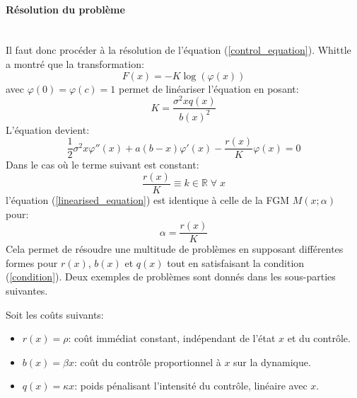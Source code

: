 \paragraph{Résolution du problème}\phantom{}\\
Il faut donc procéder à la résolution de l'équation (\ref{control_equation}). Whittle~\cite{whittle1982} a montré que la transformation: 
\[F(x)=-K\log(\varphi(x))\]
avec $\varphi(0)=\varphi(c)=1$ permet de linéariser l'équation en posant:
\[
K=\frac{\sigma^2xq(x)}{{b(x)}^2}
\]
L'équation devient:
\begin{equation}\label{linearised_equation}
    \frac{1}{2}\sigma^2 x\varphi''(x) + a(b - x)\varphi'(x) - \frac{r(x)}{K}\varphi(x) = 0
\end{equation}
Dans le cas où le terme suivant est constant:
\begin{equation}\label{condition}
    \frac{r(x)}{K}\equiv k\in\mathds{R}\;\forall\;x
\end{equation}
l'équation (\ref{linearised_equation}) est identique à celle de la \acl{FGM} $M(x;\alpha)$ pour:
\[
\alpha=\frac{r(x)}{K}
\]
Cela permet de résoudre une multitude de problèmes en supposant différentes formes pour $r(x)$, $b(x)$ et $q(x)$ tout en satisfaisant la condition (\ref{condition}). 
Deux exemples de problèmes sont donnés dans les sous-parties suivantes.

Soit les coûts suivants:
\begin{itemize}
    \item $r(x) = \rho$: coût immédiat constant, indépendant de l'état $x$ et du contrôle.
    \item $b(x) = \beta x$: coût du contrôle proportionnel à $x$ sur la dynamique.
    \item $q(x) = \kappa x$: poids pénalisant l'intensité du contrôle, linéaire avec $x$.
\end{itemize}

